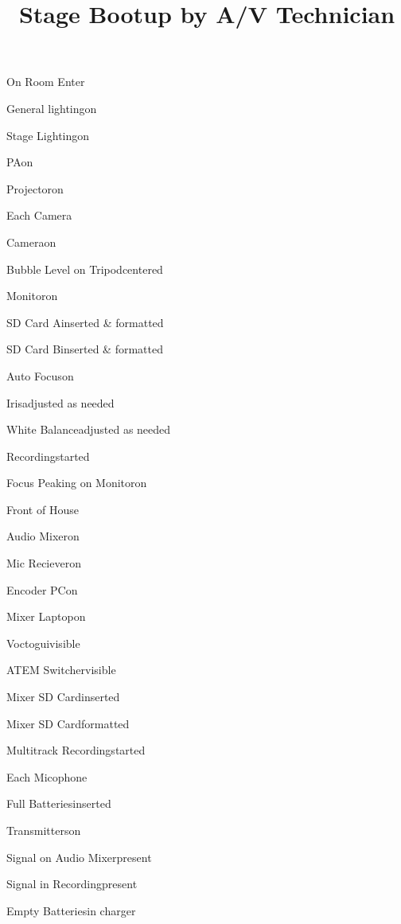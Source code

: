 \def\papersize{4}




\title{Stage Bootup by A/V Technician}

\begin{checklist}{On Room Enter}
  \item{General lighting}{on}
  \item{Stage Lighting}{on}
  \item{PA}{on}
  \item{Projector}{on}
\end{checklist}

\begin{checklist}{Each Camera}
  \item{Camera}{on}
  \item{Bubble Level on Tripod}{centered}
  \item{Monitor}{on}
  \item{SD Card A}{inserted \& formatted}
  \item{SD Card B}{inserted \& formatted}
  \item{Auto Focus}{on}
  \item{Iris}{adjusted as needed}
  \item{White Balance}{adjusted as needed}
  \item{Recording}{started}
  \item{Focus Peaking on Monitor}{on}
\end{checklist}

\begin{checklist}{Front of House}
  \item{Audio Mixer}{on}
  \item{Mic Reciever}{on}
  \item{Encoder PC}{on}
  \item{Mixer Laptop}{on}
  \item{Voctogui}{visible}
  \item{ATEM Switcher}{visible}
  \item{Mixer SD Card}{inserted}
  \item{Mixer SD Card}{formatted}
  \item{Multitrack Recording}{started}
\end{checklist}

\begin{checklist}{Each Micophone}
  \item{Full Batteries}{inserted}
  \item{Transmitters}{on}
  \item{Signal on Audio Mixer}{present}
  \item{Signal in Recording}{present}
  \item{Empty Batteries}{in charger}
\end{checklist}

